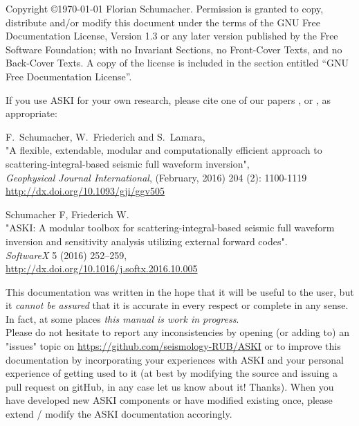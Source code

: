 \documentclass[12pt,a4paper]{article}
\newcommand{\ASKI}{ {\ttfamily ASKI} }
\begin{document}
\sloppy
%
\setlength{\parindent}{0cm}
\addtolength{\parskip}{0.5em}
%
%

%
%
Copyright \copyright {\myyear \today} Florian Schumacher.
Permission is granted to copy, distribute and/or modify this document
under the terms of the GNU Free Documentation License, Version 1.3
or any later version published by the Free Software Foundation;
with no Invariant Sections, no Front-Cover Texts, and no Back-Cover Texts.
A copy of the license is included in the section entitled ``GNU
Free Documentation License''.

\vspace{1cm}

If you use \ASKI{} for your own research, please cite one of our papers \cite{Schumacher16}, 
or \cite{Schumacher16b}, as appropriate:

F.\ Schumacher, W.\ Friederich and S.\ Lamara, \\
"A flexible, extendable, modular and 
computationally efficient approach to scattering-integral-based seismic full waveform 
inversion", \\
\emph{Geophysical Journal International}, (February, 2016) 204 (2): 1100-1119\\
\url{http://dx.doi.org/10.1093/gji/ggv505}

Schumacher F, Friederich W.\\
"ASKI: A modular toolbox for scattering-integral-based seismic full waveform 
inversion and sensitivity analysis utilizing external forward codes".\\
\emph{SoftwareX} 5 (2016) 252--259,\\
\url{http://dx.doi.org/10.1016/j.softx.2016.10.005}

\vspace{1em}

This documentation was written in the hope that it will be useful to the user,
but it \emph{cannot be assured} that it is accurate in every respect or complete in any sense.
In fact, at some places \emph{this manual is work in progress}.\\
Please do not hesitate to report any inconsistencies by
opening (or adding to) an "issues" topic on \url{https://github.com/seismology-RUB/ASKI}
or to improve this documentation by incorporating your experiences with \ASKI{} 
and your personal experience of getting used to it (at best by modifying the source and issuing a pull request
on gitHub, in any case let us know about it! Thanks).
When you have developed new \ASKI{} components or 
have modified existing once, please extend / modify the \ASKI{} documentation accoringly.
\end{document}
